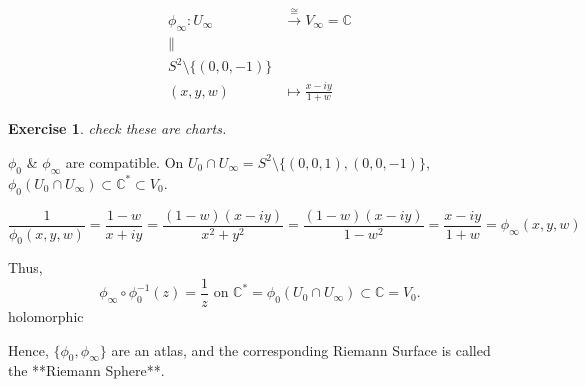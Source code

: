 \documentclass{article}
\newtheorem{exercise}{Exercise}
\begin{document}
\begin{align*}
    \phi_{\infty} : U_{\infty} &\xrightarrow{\cong} V_{\infty} = \mathbb{C} \\
    \parallel \\
    S^2 \setminus \{ (0, 0, -1) \} \\
    (x, y, w) &\longmapsto \frac{x-iy}{1+w}
\end{align*}

\begin{exercise}
check these are charts.
\end{exercise} 

$\phi_0$ \& $\phi_{\infty}$ are compatible. On $U_0 \cap U_{\infty} = S^2 \setminus \{ (0,0,1), (0,0,-1) \}$, $\phi_0(U_0 \cap U_{\infty}) \subset \mathbb{C}^* \subset V_0$.

$$
\frac{1}{\phi_0(x, y, w)} = \frac{1-w}{x+iy} = \frac{(1-w)(x-iy)}{x^2+y^2} = \frac{(1-w)(x-iy)}{1-w^2} = \frac{x-iy}{1+w} = \phi_{\infty}(x, y, w)
$$

Thus,
$$
\phi_{\infty} \circ \phi_0^{-1} (z) = \frac{1}{z} \text{ on } \mathbb{C}^* = \phi_0 (U_0 \cap U_{\infty}) \subset \mathbb{C} = V_0.
$$
holomorphic

Hence, $\{ \phi_0, \phi_{\infty} \}$ are an atlas, and the corresponding Riemann Surface is called the **Riemann Sphere**.
\end{document}
